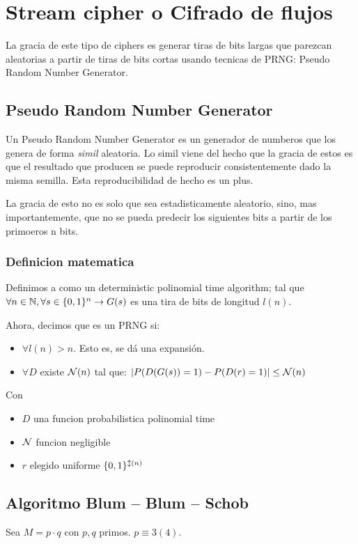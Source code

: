 \documentclass[12pt,a4paper]{report}
\begin{document}
\chapter{Stream cipher o Cifrado de flujos}
La gracia de este tipo de ciphers es generar tiras de bits largas que parezcan aleatorias a partir de tiras de bits cortas usando tecnicas de PRNG: Pseudo Random Number Generator.

\section{Pseudo Random Number Generator}
Un Pseudo Random Number Generator es un generador de numberos que los genera de forma \textit{simil} aleatoria. Lo simil viene del hecho que la gracia de estos es que el resultado que producen se puede reproducir consistentemente dado la misma semilla. Esta reproducibilidad de hecho es un plus.

La gracia de esto no es solo que sea estadisticamente aleatorio, sino, mas importantemente, que no se pueda predecir los siguientes bits a partir de los primoeros n bits.

\subsection{Definicion matematica}

Definimos a  como un deterministic polinomial time algorithm; tal que $\forall n \in \mathbb{{N}}, \forall s \in \{0,1\}^n \rightarrow G(s)$ es una tira de bits de longitud $\textit{l}(n)$.

Ahora, decimos que  es un PRNG si:
\begin{itemize}
  \item{$\forall \textit{l}(n) > n$. Esto es, se dá una expansión.}
  \item{$\forall D$ existe $\mathcal{{N}}(n)$ tal que: $|P(D(G(s)) = 1) - P(D(r) = 1) | \leq \mathcal{{N}}(n)$}
\end{itemize}

Con
\begin{itemize}
  \item{$D$ una funcion probabilistica polinomial time}
  \item{$\mathcal{{N}}$ funcion negligible}
  \item{$r$ elegido uniforme $\{0, 1\}^{\mathcal{{l}}(n)}$}
\end{itemize}

\section{Algoritmo Blum -- Blum -- Schob}
Sea $M = p \cdot q$ con $p, q$ primos. $p \equiv 3(4)$.
\end{document}
